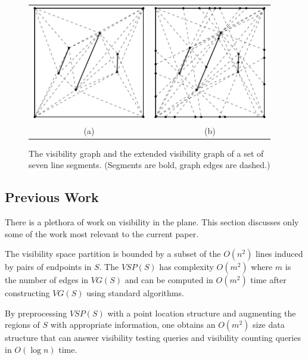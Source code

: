\documentclass{patmorin}
\newcommand{\VG}{\mathit{VG}}
\newcommand{\VSP}{\mathit{VSP}}
\begin{document}
\begin{figure}
  \begin{center}
    \begin{tabular}{cc}
    \includegraphics[width=5cm]{vg} & \includegraphics[width=5cm]{evg} \\
    (a) & (b)
    \end{tabular}
  \end{center}
  \caption{The visibility graph and the extended visibility graph of a set
       of seven line segments. (Segments are bold, graph edges are dashed.)}
\end{figure}

\subsection{Previous Work}

There is a plethora of work on visibility in the plane.  This section
discusses only some of the work most relevant to the current paper.

The visibility space partition is bounded by a subset of the $O(n^2)$ lines
induced by pairs of endpoints in $S$. The  $\VSP(S)$ has complexity $O(m^2)$
where $m$ is the number of edges in $\VG(S)$ and can be computed in $O(m^2)$
time after constructing $\VG(S)$ using standard algorithms.

By preprocessing $\VSP(S)$ with a point location structure and augmenting
the regions of $S$ with appropriate information, one obtains an $O(m^2)$
size data structure that can answer visibility testing queries and visibility
counting queries in $O(\log n)$ time.
\end{document}
